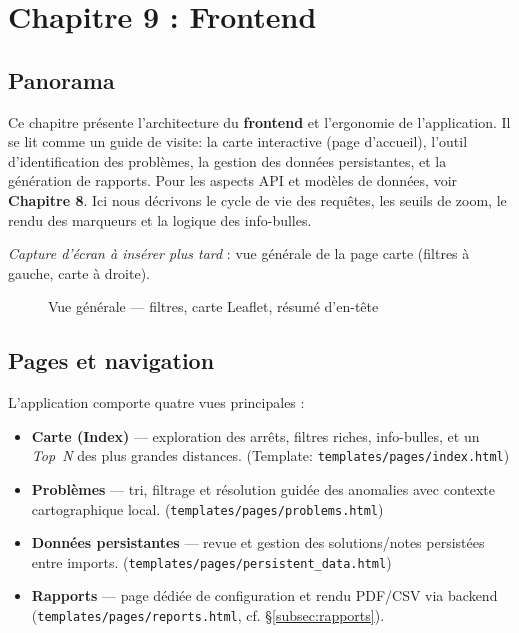 \chapter{Chapitre 9 : Frontend}

\section*{Panorama}

Ce chapitre présente l'architecture du \textbf{frontend} et l'ergonomie de l'application. Il se lit comme un guide de visite: la carte interactive (page d'accueil), l'outil d'identification des problèmes, la gestion des données persistantes, et la génération de rapports. Pour les aspects API et modèles de données, voir \textbf{Chapitre 8}. Ici nous décrivons le cycle de vie des requêtes, les seuils de zoom, le rendu des marqueurs et la logique des info-bulles.

\medskip
\noindent
\textit{Capture d'écran à insérer plus tard} : vue générale de la page carte (filtres à gauche, carte à droite).

\begin{figure}[h]
  \centering
  \caption{Vue générale — filtres, carte Leaflet, résumé d'en-tête}
  \label{fig:frontend-index}
\end{figure}

\section{Pages et navigation}

L'application comporte quatre vues principales :
\begin{itemize}
  \item \textbf{Carte (Index)} — exploration des arrêts, filtres riches, info-bulles, et un \emph{Top~N} des plus grandes distances. (Template: \texttt{templates/pages/index.html})
  \item \textbf{Problèmes} — tri, filtrage et résolution guidée des anomalies avec contexte cartographique local. (\texttt{templates/pages/problems.html})
  \item \textbf{Données persistantes} — revue et gestion des solutions/notes persistées entre imports. (\texttt{templates/pages/persistent\_data.html})
  \item \textbf{Rapports} — page dédiée de configuration et rendu PDF/CSV via backend (\texttt{templates/pages/reports.html}, cf. \S\ref{subsec:rapports}).
\end{itemize}

